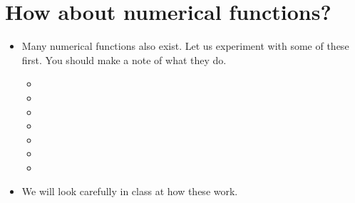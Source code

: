 \documentclass[letterpaper,10pt,english]{sphinxmanual}
\begin{document}
\section{How about numerical functions?}
\label{\detokenize{lecture_notes/lec04_modules_functions1:how-about-numerical-functions}}\begin{itemize}
\item {} 
Many numerical functions also exist. Let us experiment with some of
these first. You should make a note of what they do.
\begin{itemize}
\item {} 

\item {} 

\item {} 

\item {} 

\item {} 

\item {} 

\item {} 

\end{itemize}

\item {} 
We will look carefully in class at how these work.

\end{itemize}
\end{document}
